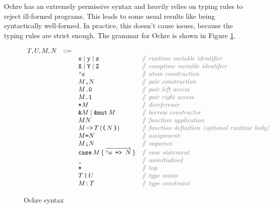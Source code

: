 \documentclass[12pt,twoside]{report}
\begin{document}
Ochre has an extremely permissive syntax and heavily relies on typing rules to reject ill-formed programs. This leads to some usual results like  being syntactically well-formed. In practice, this doesn't cause issues, because the typing rules are strict enough. The grammar for Ochre is shown in Figure \ref{fig:syntax}.

\begin{figure}[H]
  \arraycolsep=1pt %
  \centering

  \vspace{-2ex} %
  \[
  \begin{array}[t]{llll}
    T, U, M, N & ::= & & \\
    && \mono{x}\mid{}\mono{y}\mid{}\mono{z} & \comment{runtime variable identifier} \\
    && \mono{X}\mid{}\mono{Y}\mid{}\mono{Z} & \comment{comptime variable identifier} \\
    && \mono{'}a & \comment{atom construction} \\
    && M\mono{,} N & \comment{pair construction} \\
    && M\mono{.0} & \comment{pair left access} \\
    && M\mono{.1} & \comment{pair right access} \\
    && \mono{*}M & \comment{dereference} \\
    && \mono{\&}M \mid \mono{\&mut}\,M & \comment{borrow constructor} \\
    && M N & \comment{function application} \\
    && M \, \mono{->} \, T \,(\mono{\{}\,N\,\mono{\}}) & \comment{function definition (optional runtime body)} \\
    && M \mono{=} N & \comment{assignment} \\
    && M\mono{;} N & \comment{sequence} \\
    && \mono{case}\,M\,\{\,\overrightarrow{\mono{'}a\mono{ => }N}\,\} & \comment{case statement} \\
    && \mono{\_} & \comment{uninitialised} \\
    && \mono{*} & \comment{top} \\
    && T\,\mono{|}\,U & \comment{type union} \\
    && M\mono{:}\,T & \comment{type constraint} \\
  \end{array} %
  \]
\caption{Ochre syntax} %
\label{fig:syntax} %
\end{figure} %
\end{document}
